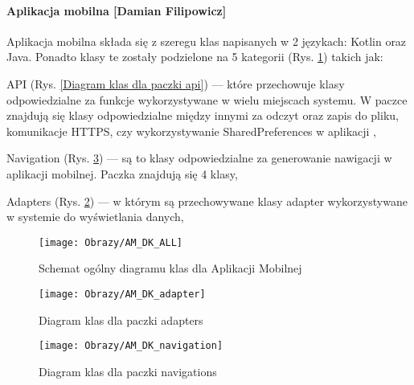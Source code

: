 		\paragraph*{Aplikacja mobilna [Damian Filipowicz]}
		Aplikacja mobilna składa się z szeregu klas napisanych w 2 językach: Kotlin oraz Java. Ponadto klasy te zostały podzielone na 5 kategorii (Rys. \ref{Schemat ogólny diagramu klas dla Aplikacji mobilnej}) takich jak:
		\begin{itemize*}
			\item API 
			(Rys. \ref{Diagram klas dla paczki api}) 
			---  które przechowuje klasy odpowiedzialne za funkcje wykorzystywane w wielu miejscach systemu. W paczce znajdują się klasy odpowiedzialne między innymi za odczyt oraz zapis do pliku, komunikacje HTTPS, czy wykorzystywanie SharedPreferences w aplikacji ,
			\item Navigation 
			(Rys. \ref{Diagram klas dla paczki navigations}) 
			--- są to klasy odpowiedzialne za generowanie nawigacji w aplikacji mobilnej. Paczka znajdują się 4 klasy,
			\item Adapters
			(Rys. \ref{Diagram klas dla paczki adapters}) 
			 --- w którym są przechowywane klasy adapter wykorzystywane w systemie do wyświetlania danych,
		\end{itemize*}
	
	\begin{figure}[ht!]
		\centering
		\vspace{-0.6cm}
		\texttt{[image: Obrazy/AM\_DK\_ALL]}
		\caption{Schemat ogólny diagramu klas dla Aplikacji Mobilnej}
		\label{Schemat ogólny diagramu klas dla Aplikacji mobilnej}
	\end{figure}
	\newpage
\begin{figure}[ht!]
	\centering
	\texttt{[image: Obrazy/AM\_DK\_adapter]}
	\caption{Diagram klas dla paczki adapters}
	\label{Diagram klas dla paczki adapters}
\end{figure}
\newpage
\begin{figure}[ht!]
	\centering
	\texttt{[image: Obrazy/AM\_DK\_navigation]}
	\caption{Diagram klas dla paczki navigations}
	\label{Diagram klas dla paczki navigations}
\end{figure}

